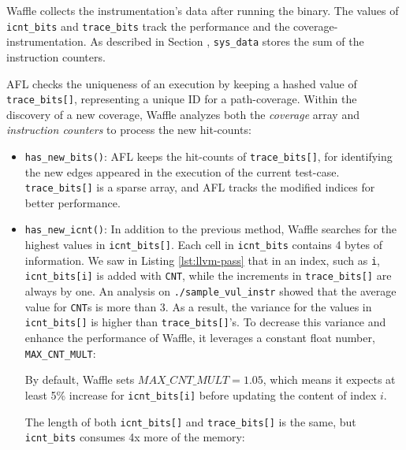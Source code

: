 Waffle collects the instrumentation's data after running the binary. The values of \texttt{icnt\_bits} and \texttt{trace\_bits} track the performance and the coverage-instrumentation. As described in Section , \texttt{sys\_data} stores the sum of the instruction counters.

AFL checks the uniqueness of an execution by keeping a hashed value of \texttt{trace\_bits[]}, representing a unique ID for a path-coverage. Within the discovery of a new coverage, Waffle analyzes both the \textit{coverage} array and \textit{instruction counters} to process the new hit-counts:

\begin{itemize}
    \item \texttt{has\_new\_bits()}: AFL keeps the hit-counts of \texttt{trace\_bits[]}, for identifying the new edges appeared in the execution of the current test-case. \texttt{trace\_bits[]} is a sparse array, and AFL tracks the modified indices for better performance.
    \item \texttt{has\_new\_icnt()}: In addition to the previous method, Waffle searches for the highest values in \texttt{icnt\_bits[]}. Each cell in \texttt{icnt\_bits} contains 4 bytes of information. We saw in Listing \ref{lst:llvm-pass} that in an index, such as \texttt{i}, \texttt{icnt\_bits[i]} is added with \texttt{CNT}, while the increments in \texttt{trace\_bits[]} are always by one. An analysis on \texttt{./sample\_vul\_instr} showed that the average value for \texttt{CNT}s is more than 3. As a result, the variance for the values in \texttt{icnt\_bits[]} is higher than \texttt{trace\_bits[]}'s. To decrease this variance and enhance the performance of Waffle, it leverages a constant float number, \texttt{MAX\_CNT\_MULT}:
    
    

    By default, Waffle sets $MAX\_CNT\_MULT=1.05$, which means it expects at least 5\% increase for \texttt{icnt\_bits[i]} before updating the content of index $i$.

    The length of both \texttt{icnt\_bits[]} and \texttt{trace\_bits[]} is the same, but \texttt{icnt\_bits} consumes 4x more of the memory:
    
\end{itemize}

